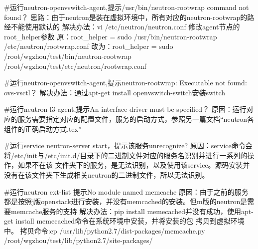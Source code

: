 \documentclass[a4paper,left=1.5cm,right=1.5cm,11pt]{article}
\begin{document}
\begin{itemize}
			#运行neutron-openvswitch-agent,提示/usr/bin/neutron-rootwrap command not found？
			思路：由于neutron是装在虚拟环境中，所有对应的neutron-rootwrap的路经不能使用默认的
			解决办法：vi /etc/neutron/neutron.conf 修改agent节点的root_helper参数
			原：root_helper = sudo /usr/bin/neutron-rootwrap /etc/neutron/rootwrap.conf
			改为：root_helper = sudo /root/wgzhou/test/bin/neutron-rootwrap /root/wgzhou/test/etc/neutron/rootwrap.conf

			#运行neutron-openvswitch-agent,提示neutron-rootwrap: Executable not found: ovs-vsctl？
			解决办法：通过apt-get install openvswitch-switch安装switch

			#运行neutron-l3-agent,提示An interface driver must be specified？
			原因：运行对应的服务需要指定对应的配置文件，服务的启动方式，参照另一篇文档“neutron各组件的正确启动方式.tex”

			#运行service neutron-server start，提示该服务unrecognize?
			原因：service命令会将/etc/init与/etc/init.d/目录下的二进制文件对应的服务名识别并进行一系列的操作，如果不在该
			文件夹下的服务，是无法识别，以及使用该service。源码安装并没有在该文件夹下生成相关neutron的二进制文件，所以无法识别。

			#运行neutron ext-list 提示No module named memcache
			原因：由于之前的服务都是按照j版openstack进行安装，并没有memcached的安装。但m版的neutron是需要memcache服务的支持
			解决办法：pip install memecached并没有成功，使用apt-get install memecached命令在系统环境中安装，并将安装的包
			拷贝到虚拟环境中。
			拷贝命令:cp /usr/lib/python2.7/dist-packages/memcache.py /root/wgzhou/test/lib/python2.7/site-packages/
		
    \end{itemize}
\end{document}
